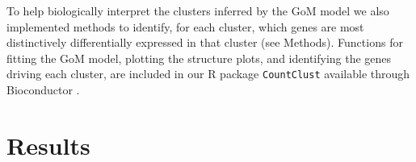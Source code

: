 To help biologically interpret the clusters inferred by the GoM model we also implemented methods to identify, for each cluster, which genes
are most distinctively differentially expressed in that cluster (see Methods). Functions for fitting the GoM model, plotting the
structure plots, and identifying the genes driving each cluster, are included in our R package {\tt CountClust} \cite{Dey2016} available through Bioconductor \cite{Gentleman2003}.  

\section{Results}

%
%
%
%
%
%
%
%
%
%
%


